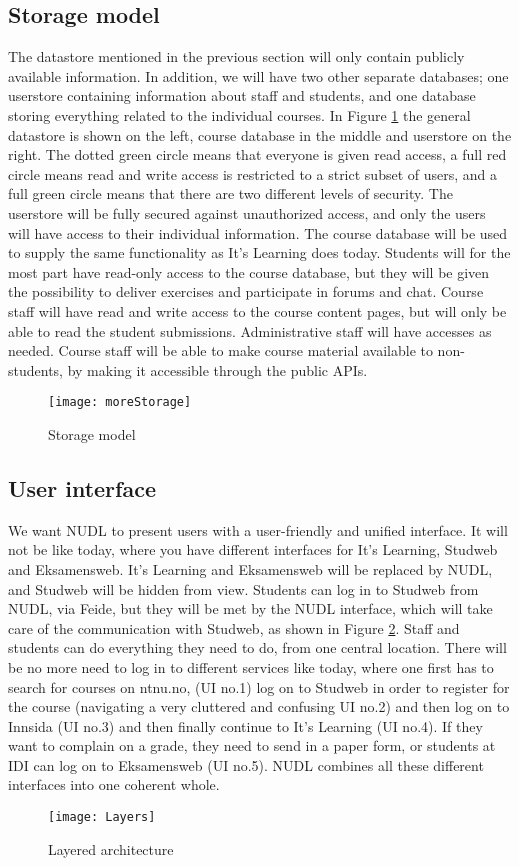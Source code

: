 	\subsection{Storage model}
		The datastore mentioned in the previous section will only contain publicly available information. In addition, we will have two other separate databases; one userstore containing information about staff and students, and one database storing everything related to the individual courses. In Figure \ref{fig:storagemodel} the general datastore is shown on the left, course database in the middle and userstore on the right. The dotted green circle means that everyone is given read access, a full red circle means read and write access is restricted to a strict subset of users, and a full green circle means that there are two different levels of security. The userstore will be fully secured against unauthorized access, and only the users will have access to their individual information. The course database will be used to supply the same functionality as It's Learning does today. Students will for the most part have read-only access to the course database, but they will be given the possibility to deliver exercises and participate in forums and chat. Course staff will have read and write access to the course content pages, but will only be able to read the student submissions. Administrative staff will have accesses as needed. 
Course staff will be able to make course material available to non-students, by making it accessible through the public APIs. 
\begin{figure}
\centering
\texttt{[image: moreStorage]}
\caption{Storage model}
\label{fig:storagemodel}
\end{figure}

		
	\subsection{User interface} 
		We want NUDL to present users with a user-friendly and unified interface. It will not be like today, where you have different interfaces for It's Learning, Studweb and Eksamensweb. It's Learning and Eksamensweb will be replaced by NUDL, and Studweb will be hidden from view. Students can log in to Studweb from NUDL, via Feide, but they will be met by the NUDL interface, which will take care of the communication with Studweb, as shown in Figure \ref{fig:layers}. Staff and students can do everything they need to do, from one central location. There will be no more need to log in to different services like today, where one first has to search for courses on ntnu.no, (UI no.1) log on to Studweb in order to register for the course (navigating a very cluttered and confusing UI no.2) and then log on to Innsida (UI no.3) and then finally continue to It's Learning (UI no.4). If they want to complain on a grade, they need to send in a paper form, or students at IDI can log on to Eksamensweb (UI no.5). NUDL combines all these different interfaces into one coherent whole. 
\begin{figure}
\centering
\texttt{[image: Layers]}
\caption{Layered architecture}
\label{fig:layers}
\end{figure}